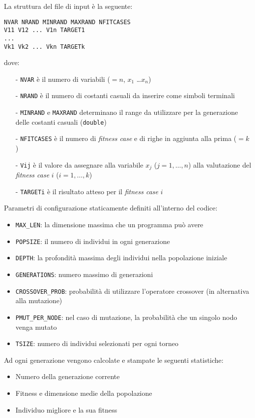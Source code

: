 \documentclass{../llncs}
\begin{document}
\noindent La struttura del file di input è la seguente:
\begin{lstlisting}[caption={Struttura del file di input}]
NVAR NRAND MINRAND MAXRAND NFITCASES
V11 V12 ... V1n TARGET1
...
Vk1 Vk2 ... Vkn TARGETk
\end{lstlisting}
dove:
\begin{itemize}
\setlength\itemsep{0.1em}
\item[-] \texttt{NVAR} è il numero di variabili ($=n$, $x_1$ \ldots $x_n$)
\item[-] \texttt{NRAND} è il numero di costanti casuali da inserire come simboli terminali
\item[-] \texttt{MINRAND} e \texttt{MAXRAND} determinano il range da utilizzare per la generazione delle costanti casuali (\texttt{double})
\item[-] \texttt{NFITCASES} è il numero di \emph{fitness case} e di righe in aggiunta alla prima ($=k$)
\item[-] \texttt{Vij} è il valore da assegnare alla variabile $x_j$ ($j = 1, \ldots, n$) alla valutazione del \emph{fitness case} $i$ ($i = 1, \ldots, k$)
\item[-] \texttt{TARGETi} è il risultato atteso per il \emph{fitness case} $i$
\end{itemize}

\noindent Parametri di configurazione staticamente definiti all'interno del codice:
\begin{itemize}
\setlength\itemsep{0.1em}
\item \texttt{MAX{\_}LEN}: la dimensione massima che un programma può avere
\item \texttt{POPSIZE}: il numero di individui in ogni generazione
\item \texttt{DEPTH}: la profondità massima degli individui nella popolazione iniziale
\item \texttt{GENERATIONS}: numero massimo di generazioni
\item \texttt{CROSSOVER{\_}PROB}: probabilità di utilizzare l'operatore crossover (in alternativa alla mutazione)
\item \texttt{PMUT{\_}PER{\_}NODE}: nel caso di mutazione, la probabilità che un singolo nodo venga mutato
\item \texttt{TSIZE}: numero di individui selezionati per ogni torneo
\end{itemize}

\noindent Ad ogni generazione vengono calcolate e stampate le seguenti statistiche:
\begin{itemize}
\setlength\itemsep{0.1em}
\item Numero della generazione corrente
\item Fitness e dimensione medie della popolazione
\item Individuo migliore e la sua fitness
\end{itemize}
\end{document}

